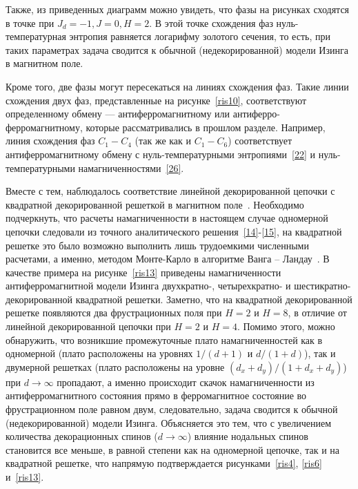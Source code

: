 Также, из приведенных диаграмм можно увидеть, что фазы на рисунках сходятся в точке при $J_d=-1, J=0, H=2$. В этой точке схождения фаз нуль-температурная энтропия равняется логарифму золотого сечения, то есть, при таких параметрах задача сводится к обычной (недекорированной) модели Изинга в магнитном поле.

Кроме того, две фазы могут пересекаться на линиях схождения фаз. Такие линии схождения двух фаз, представленные на рисунке~\ref{ris10}, соответствуют определенному обмену --- антиферромагнитному или антиферро-ферромагнитному, которые рассматривались в прошлом разделе. Например, линия схождения фаз $C_1-C_4$ (так же как и $C_1-C_6$) соответствует антиферромагнитному обмену с нуль-температурными энтропиями~\eqref{22} и нуль-температурными намагниченностями~\eqref{26}.


Вместе с тем, наблюдалось соответствие линейной декорированной цепочки с квадратной декорированной решеткой в магнитном поле~\cite{kassan-ogly2020}. Необходимо подчеркнуть, что расчеты намагниченности в настоящем случае одномерной цепочки следовали из точного аналитического решения~\eqref{14}-\eqref{15}, на квадратной решетке это было возможно выполнить лишь трудоемкими численными расчетами, а именно, методом Монте-Карло в алгоритме Ванга -- Ландау~\cite{wang1,wang2}. В качестве примера на рисунке~\ref{ris13} приведены намагниченности антиферромагнитной модели Изинга двухкратно-, четырехкратно- и шестикратно-декорированной квадратной решетки. Заметно, что на квадратной декорированной решетке появляются два фрустрационных поля при $H=2$ и $H=8$, в отличие от линейной декорированной цепочки при $H=2$ и $H=4$. Помимо этого, можно обнаружить, что возникшие промежуточные плато намагниченностей как в одномерной (плато расположены на уровнях $1/(d+1)$ и $d/(1+d)$), так и двумерной решетках (плато расположены на уровне $(d_x+d_y)/(1+d_x+d_y)$) при $d \rightarrow \infty$ пропадают, а именно происходит скачок намагниченности из антиферромагнитного состояния прямо в ферромагнитное состояние во фрустрационном поле равном двум, следовательно, задача сводится к обычной (недекорированной) модели Изинга. Объясняется это тем, что с увеличением количества декорационных спинов ($d\rightarrow \infty$) влияние нодальных спинов становится все меньше, в равной степени как на одномерной цепочке, так и на квадратной решетке, что напрямую подтверждается рисунками~\ref{ris4}, \ref{ris6} и~\ref{ris13}.

\FloatBarrier